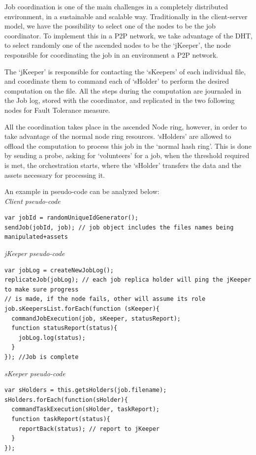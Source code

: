 Job coordination is one of the main challenges in a completely distributed environment, in a sustainable and scalable way. Traditionally in the client-server model, we have the possibility to select one of the nodes to be the job coordinator. To implement this in a P2P network, we take advantage of the DHT, to select randomly one of the ascended nodes to be the `jKeeper', the node responsible for coordinating the job in an environment a P2P network.

The `jKeeper' is responsible for contacting the `sKeepers' of each individual file, and coordinate them to command each of `sHolder' to perform the desired computation on the file. All the steps during the computation are journaled in the Job log, stored with the coordinator, and replicated in the two following nodes for Fault Tolerance measure.

All the coordination takes place in the ascended Node ring, however, in order to take advantage of the normal node ring resources. `sHolders' are allowed to offload the computation to process this job in the `normal hash ring'. This is done by sending a probe, asking for `volunteers' for a job, when the threshold required is met, the orchestration starts, where the `sHolder' transfers the data and the assets necessary for processing it.

An example in pseudo-code can be analyzed below: \\

\textit{Client pseudo-code}
\begingroup
\scriptsize
\begin{verbatim}
var jobId = randomUniqueIdGenerator();
sendJob(jobId, job); // job object includes the files names being manipulated+assets
\end{verbatim}  
\endgroup



\textit{jKeeper pseudo-code}
\begingroup
\scriptsize
\begin{verbatim}
var jobLog = createNewJobLog();
replicateJob(jobLog); // each job replica holder will ping the jKeeper to make sure progress 
// is made, if the node fails, other will assume its role
job.sKeepersList.forEach(function (sKeeper){
  commandJobExecution(job, sKeeper, statusReport);
  function statusReport(status){
    jobLog.log(status);
  }  
}); //Job is complete
\end{verbatim}
\endgroup

\textit{sKeeper pseudo-code}
\begingroup
\scriptsize
\begin{verbatim}
var sHolders = this.getsHolders(job.filename);
sHolders.forEach(function(sHolder){
  commandTaskExecution(sHolder, taskReport);
  function taskReport(status){
    reportBack(status); // report to jKeeper
  }
});
\end{verbatim}
\endgroup

